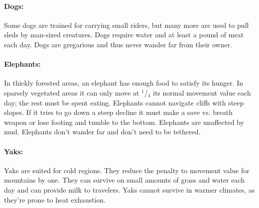 \begin{multicols}{2}
\paragraph{Dogs:} Some dogs are trained for carrying small riders, but many more are used to pull sleds by man-sized creatures.  Dogs require water and at least a pound of meat each day.  Dogs are gregarious and thus never wander far from their owner.

\paragraph{Elephants:} In thickly forested areas, an elephant has enough food to satisfy its hunger.  In sparsely vegetated areas it can only move at $^1$/$_4$ its normal movement value each day; the rest must be spent eating.  Elephants cannot navigate cliffs with steep slopes.  If it tries to go down a steep decline it must make a save vs. breath weapon or lose footing and tumble to the bottom.  Elephants are unaffected by mud.  Elephants don't wander far and don't need to be tethered.

\paragraph{Yaks:} Yaks are suited for cold regions.  They reduce the penalty to movement value for mountains by one.  They can survive on small amounts of grass and water each day and can provide milk to travelers.  Yaks cannot survive in warmer climates, as they're prone to heat exhaustion. 

\columnbreak

\noindent
\begin{minipage}{\columnwidth}


\end{minipage}
\end{multicols}
